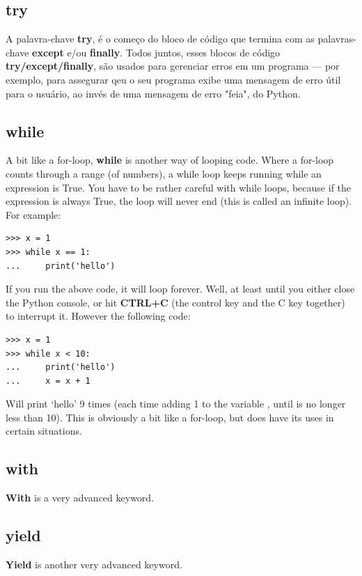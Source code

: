 \subsection*{try}

A palavra-chave \textbf{try}, é o começo do bloco de código que termina com as palavras-chave \textbf{except} e/ou \textbf{finally}. Todos juntos, esses blocos de código \textbf{try/except/finally}, são usados para gerenciar erros em um programa --- por exemplo, para assegurar qeu o seu programa exibe uma mensagem de erro útil para o usuário, ao invés de uma mensagem de erro "feia", do Python.

\subsection*{while}

A bit like a for-loop, \textbf{while} is another way of looping code.  Where a for-loop counts through a range (of numbers), a while loop keeps running while an expression is True.  You have to be rather careful with while loops, because if the expression is always True, the loop will never end (this is called an infinite loop).  For example:

\begin{listingignore}
\begin{verbatim}
>>> x = 1
>>> while x == 1:
...     print('hello')
\end{verbatim}
\end{listingignore}

If you run the above code, it will loop forever.  Well, at least until you either close the Python console, or hit \textbf{CTRL+C} (the control key and the C key together) to interrupt it. However the following code:

\begin{listing}
\begin{verbatim}
>>> x = 1
>>> while x < 10:
...     print('hello')
...     x = x + 1
\end{verbatim}
\end{listing}

Will print `hello' 9 times (each time adding 1 to the variable , until  is no longer less than 10). This is obviously a bit like a for-loop, but does have its uses in certain situations.

\subsection*{with}

\textbf{With} is a very advanced keyword.

\subsection*{yield}
\textbf{Yield} is another very advanced keyword.

\newpage
